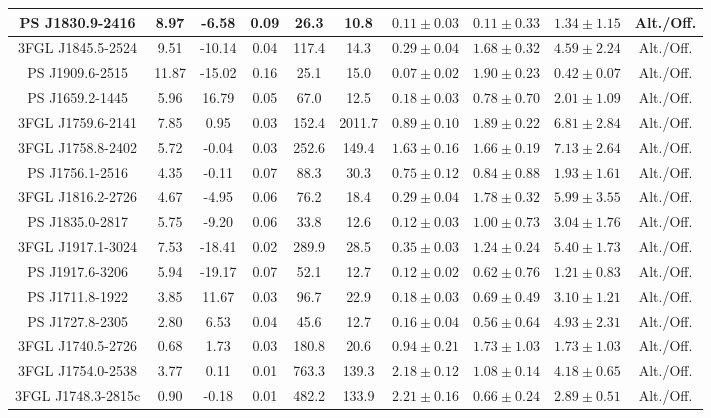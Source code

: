 \begin{table*}
\begin{tabular}{|c|c|c|c|c|c|c|c|c|c|}
\hline 
 PS J1830.9-2416 & 8.97 & -6.58 & 0.09 & 26.3 & 10.8 & $0.11\pm0.03$ & $0.11\pm0.33$ & $1.34\pm1.15$ & Alt./Off.\\
\hline 
 3FGL J1845.5-2524 & 9.51 & -10.14 & 0.04 & 117.4 & 14.3 & $0.29\pm0.04$ & $1.68\pm0.32$ & $4.59\pm2.24$ & Alt./Off.\\
\hline 
 PS J1909.6-2515 & 11.87 & -15.02 & 0.16 & 25.1 & 15.0 & $0.07\pm0.02$ & $1.90\pm0.23$ & $0.42\pm0.07$ & Alt./Off.\\
\hline 
 PS J1659.2-1445 & 5.96 & 16.79 & 0.05 & 67.0 & 12.5 & $0.18\pm0.03$ & $0.78\pm0.70$ & $2.01\pm1.09$ & Alt./Off.\\
\hline 
 3FGL J1759.6-2141 & 7.85 & 0.95 & 0.03 & 152.4 & 2011.7 & $0.89\pm0.10$ & $1.89\pm0.22$ & $6.81\pm2.84$ & Alt./Off.\\
\hline 
 3FGL J1758.8-2402 & 5.72 & -0.04 & 0.03 & 252.6 & 149.4 & $1.63\pm0.16$ & $1.66\pm0.19$ & $7.13\pm2.64$ & Alt./Off.\\
\hline 
 PS J1756.1-2516 & 4.35 & -0.11 & 0.07 & 88.3 & 30.3 & $0.75\pm0.12$ & $0.84\pm0.88$ & $1.93\pm1.61$ & Alt./Off.\\
\hline 
 3FGL J1816.2-2726 & 4.67 & -4.95 & 0.06 & 76.2 & 18.4 & $0.29\pm0.04$ & $1.78\pm0.32$ & $5.99\pm3.55$ & Alt./Off.\\
\hline 
 PS J1835.0-2817 & 5.75 & -9.20 & 0.06 & 33.8 & 12.6 & $0.12\pm0.03$ & $1.00\pm0.73$ & $3.04\pm1.76$ & Alt./Off.\\
\hline 
 3FGL J1917.1-3024 & 7.53 & -18.41 & 0.02 & 289.9 & 28.5 & $0.35\pm0.03$ & $1.24\pm0.24$ & $5.40\pm1.73$ & Alt./Off.\\
\hline 
 PS J1917.6-3206 & 5.94 & -19.17 & 0.07 & 52.1 & 12.7 & $0.12\pm0.02$ & $0.62\pm0.76$ & $1.21\pm0.83$ & Alt./Off.\\
\hline 
 PS J1711.8-1922 & 3.85 & 11.67 & 0.03 & 96.7 & 22.9 & $0.18\pm0.03$ & $0.69\pm0.49$ & $3.10\pm1.21$ & Alt./Off.\\
\hline 
 PS J1727.8-2305 & 2.80 & 6.53 & 0.04 & 45.6 & 12.7 & $0.16\pm0.04$ & $0.56\pm0.64$ & $4.93\pm2.31$ & Alt./Off.\\
\hline 
 3FGL J1740.5-2726 & 0.68 & 1.73 & 0.03 & 180.8 & 20.6 & $0.94\pm0.21$ & $1.73\pm1.03$ & $1.73\pm1.03$ & Alt./Off.\\
\hline 
 3FGL J1754.0-2538 & 3.77 & 0.11 & 0.01 & 763.3 & 139.3 & $2.18\pm0.12$ & $1.08\pm0.14$ & $4.18\pm0.65$ & Alt./Off.\\
\hline 
 3FGL J1748.3-2815c & 0.90 & -0.18 & 0.01 & 482.2 & 133.9 & $2.21\pm0.16$ & $0.66\pm0.24$ & $2.89\pm0.51$ & Alt./Off.\\

\end{tabular}
\end{table*}
